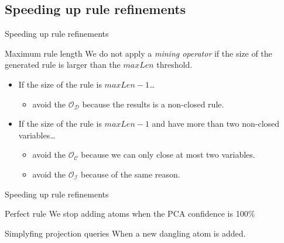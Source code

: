\documentclass[xcolor={x11names}]{beamer}
\begin{document}
\subsection{Speeding up rule refinements}
\begin{frame}{Speeding up rule refinements}

    \begin{block}{Maximum rule length}
        We do not apply a \textit{mining operator} if the size of the generated rule is 
        larger than the \textbf{$maxLen$} threshold.
	\end{block}

	\begin{itemize}
        \item If the size of the rule is \textbf{$maxLen -1$}\ldots
	        \begin{itemize}
                \item avoid the $\mathcal{O}_\mathcal{D}$ because the results is a non-closed rule.
	        \end{itemize}
        \item If the size of the rule is \textbf{$maxLen -1$} and have more than two non-closed variables\ldots
	        \begin{itemize}
                \item avoid the $\mathcal{O}_\mathcal{C}$ because we can only close at most two variables.
                \item avoid the $\mathcal{O}_\mathcal{I}$ because of the same reason.
	        \end{itemize}
	\end{itemize}

\end{frame}

\begin{frame}{Speeding up rule refinements}

    \begin{block}{Perfect rule}
        We stop adding atoms when the PCA confidence is 100\%
	\end{block}

    \begin{block}{Simplyfing projection queries}
        When a new dangling atom is added.
	\end{block}

\end{frame}
\end{document}
